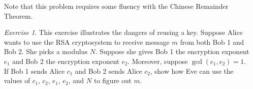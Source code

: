 \documentclass{article}
\theoremstyle{definition}
\theoremstyle{remark}
\newtheorem{exercise}{Exercise}
\begin{document}
    Note that this problem requires some fluency with the Chinese Remainder Theorem.
    \fi

    \begin{exercise}
        This exercise illustrates the dangers of reusing a key.
        Suppose Alice wants to use the RSA cryptosystem to receive message \(m\) from both Bob 1 and Bob 2.
        She picks a modulus \(N\).
        Suppose she gives Bob 1 the encryption exponent \(e_1\) and Bob 2 the encryption exponent \(e_2\).
        Moreover, suppose \(\gcd(e_1,e_2)=1\).
        If Bob 1 sends Alice \(c_1\) and Bob 2 sends Alice \(c_2\), show how Eve can use the values of \(c_1\), \(c_2\), \(e_1\), \(e_2\), and \(N\) to figure out \(m\).
    \end{exercise}
    \iffalse
    Solution: 
    Use Bezout's lemma to get \(e_1 x + e_2 y = 1\) and consider \(c_1^x c_2^y\).
    \fi
\end{document}
